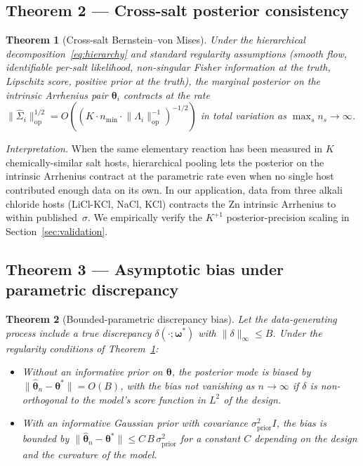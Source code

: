 \documentclass[12pt]{article}
\theoremstyle{plain}
\newtheorem{theorem}{Theorem}
\theoremstyle{definition}
\theoremstyle{remark}
\newcommand{\norm}[1]{\lVert #1 \rVert}
\begin{document}
\subsection{Theorem 2 --- Cross-salt posterior consistency}\label{sec:thm2}

\begin{theorem}[Cross-salt Bernstein--von Mises]\label{thm:bvm}
Under the hierarchical decomposition~\eqref{eq:hierarchy} and standard
regularity assumptions (smooth flow, identifiable per-salt likelihood,
non-singular Fisher information at the truth, Lipschitz score, positive
prior at the truth), the marginal posterior on the intrinsic Arrhenius
pair $\boldsymbol\theta_i$ contracts at the rate
$\norm{\hat\Sigma_i}_{\mathrm{op}}^{1/2} = O((K \cdot n_{\min} \cdot
\norm{\Lambda_i}_{\mathrm{op}}^{-1})^{-1/2})$ in total variation as
$\max_s n_s\to\infty$.
\end{theorem}

\emph{Interpretation.}  When the same elementary reaction has been measured
in $K$ chemically-similar salt hosts, hierarchical pooling lets the
posterior on the intrinsic Arrhenius contract at the parametric rate even
when no single host contributed enough data on its own.  In our application,
data from three alkali chloride hosts (LiCl-KCl, NaCl, KCl) contracts the
Zn intrinsic Arrhenius to within published~$\sigma$.  We empirically verify
the $K^{+1}$ posterior-precision scaling in Section~\ref{sec:validation}.

\subsection{Theorem 3 --- Asymptotic bias under parametric discrepancy}\label{sec:thm3}

\begin{theorem}[Bounded-parametric discrepancy bias]\label{thm:bias}
Let the data-generating process include a true discrepancy
$\delta(\cdot;\boldsymbol\omega^*)$ with $\norm{\delta}_\infty\le B$.  Under
the regularity conditions of Theorem~\ref{thm:bvm}:
\begin{itemize}
\item[(a)]  Without an informative prior on $\boldsymbol\theta$, the
posterior mode is biased by
$\norm{\hat{\boldsymbol\theta}_n - \boldsymbol\theta^*} = O(B)$, with the bias
\emph{not} vanishing as $n\to\infty$ if $\delta$ is non-orthogonal to the
model's score function in $L^2$ of the design.
\item[(b)]  With an informative Gaussian prior with covariance
$\sigma_{\mathrm{prior}}^2 I$, the bias is bounded by
$\norm{\hat{\boldsymbol\theta}_n - \boldsymbol\theta^*} \le C\,B\,\sigma_{\mathrm{prior}}^2$
for a constant $C$ depending on the design and the curvature of the model.
\end{itemize}
\end{theorem}
\end{document}
